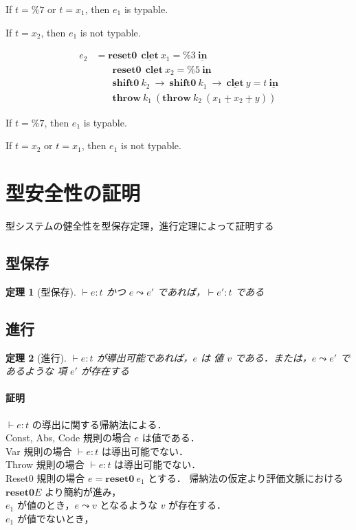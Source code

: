 \documentclass[10pt,a4j]{jarticle}
\newcommand\Resetz{\textbf{reset0}}
\newcommand\Shiftz{\textbf{shift0}}
\newcommand\Throw{\textbf{throw}}
\newcommand\cPlus{\underline{\textbf{+}}}
\newcommand\cLet{\underline{\textbf{clet}}}
\newcommand\cIn{\underline{\textbf{in}}}
\newcommand\csp[1]{\texttt{\%}{#1}}
\newcommand\lto{\leadsto}
\theoremstyle{break}
\newtheorem{theo}{定理}[section]
\begin{document}
If $t=\csp{7}$ or $t=x_1$, then $e_1$ is typable.

If $t=x_2$, then $e_1$ is not typable.

\begin{align*}
  e_2 & = \Resetz ~~\cLet~x_1=\csp{3}~\cIn \\
      & \phantom{=}~~ \Resetz ~~\cLet~x_2=\csp{5}~\cIn \\
      & \phantom{=}~~ \Shiftz~k_2~\to~ \Shiftz~k_1~\to~ \cLet~y=t~\cIn \\
      & \phantom{=}~~ \Throw~k_1~(\Throw~k_2~(x_1~\cPlus~x_2~\cPlus~y))
\end{align*}

If $t=\csp{7}$, then $e_1$ is typable.

If $t=x_2$ or $t=x_1$, then $e_1$ is not typable.

\section{型安全性の証明}
型システムの健全性を型保存定理，進行定理によって証明する

\subsection{型保存}
\begin{theo}[型保存]
  $\vdash e:t$ かつ $e \lto e'$ であれば，$\vdash e':t$ である
\end{theo}

\subsection{進行}
\begin{theo}[進行]
  $\vdash e:t$ が導出可能であれば，$e$ は 値 $v$ である．または，$e \lto e'$ であるような 項 $e'$ が存在する
\end{theo}

\paragraph{証明}
$\vdash e:t$ の導出に関する帰納法による．\\
Const, Abs, Code 規則の場合 $e$ は値である．\\
Var 規則の場合 $\vdash e:t$ は導出可能でない．\\
Throw 規則の場合 $\vdash e:t$ は導出可能でない．\\
Reset0 規則の場合 $e = \Resetz~ e_1$ とする．
帰納法の仮定より評価文脈における $\Resetz E$ より簡約が進み，\\
$e_1$ が値のとき，$e \lto v$ となるような $v$ が存在する．\\
$e_1$ が値でないとき，
\end{document}
